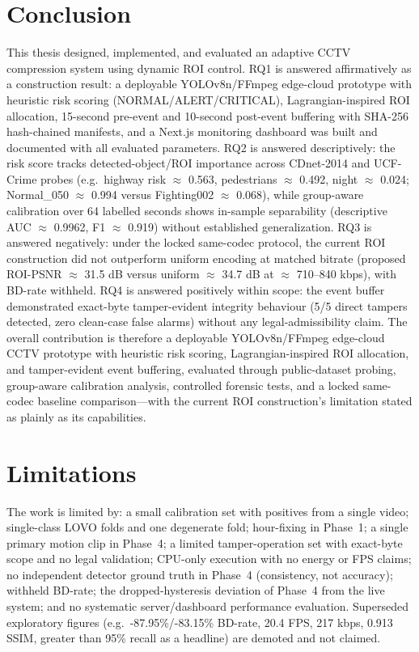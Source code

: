 \section{Conclusion}

This thesis designed, implemented, and evaluated an adaptive CCTV compression system using dynamic ROI control. RQ1 is answered affirmatively as a construction result: a deployable YOLOv8n/FFmpeg edge-cloud prototype with heuristic risk scoring (NORMAL/ALERT/CRITICAL), Lagrangian-inspired ROI allocation, 15-second pre-event and 10-second post-event buffering with SHA-256 hash-chained manifests, and a Next.js monitoring dashboard was built and documented with all evaluated parameters. RQ2 is answered descriptively: the risk score tracks detected-object/ROI importance across CDnet-2014 and UCF-Crime probes (e.g.\ highway risk $\approx$ 0.563, pedestrians $\approx$ 0.492, night $\approx$ 0.024; Normal\_050 $\approx$ 0.994 versus Fighting002 $\approx$ 0.068), while group-aware calibration over 64 labelled seconds shows in-sample separability (descriptive AUC $\approx$ 0.9962, F1 $\approx$ 0.919) without established generalization. RQ3 is answered negatively: under the locked same-codec protocol, the current ROI construction did not outperform uniform encoding at matched bitrate (proposed ROI-PSNR $\approx$ 31.5 dB versus uniform $\approx$ 34.7 dB at $\approx$ 710--840 kbps), with BD-rate withheld. RQ4 is answered positively within scope: the event buffer demonstrated exact-byte tamper-evident integrity behaviour (5/5 direct tampers detected, zero clean-case false alarms) without any legal-admissibility claim. The overall contribution is therefore a deployable YOLOv8n/FFmpeg edge-cloud CCTV prototype with heuristic risk scoring, Lagrangian-inspired ROI allocation, and tamper-evident event buffering, evaluated through public-dataset probing, group-aware calibration analysis, controlled forensic tests, and a locked same-codec baseline comparison---with the current ROI construction's limitation stated as plainly as its capabilities.

\section{Limitations}

The work is limited by: a small calibration set with positives from a single video; single-class LOVO folds and one degenerate fold; hour-fixing in Phase~1; a single primary motion clip in Phase~4; a limited tamper-operation set with exact-byte scope and no legal validation; CPU-only execution with no energy or FPS claims; no independent detector ground truth in Phase~4 (consistency, not accuracy); withheld BD-rate; the dropped-hysteresis deviation of Phase~4 from the live system; and no systematic server/dashboard performance evaluation. Superseded exploratory figures (e.g.\ -87.95\%/-83.15\% BD-rate, 20.4 FPS, 217 kbps, 0.913 SSIM, greater than 95\% recall as a headline) are demoted and not claimed.

